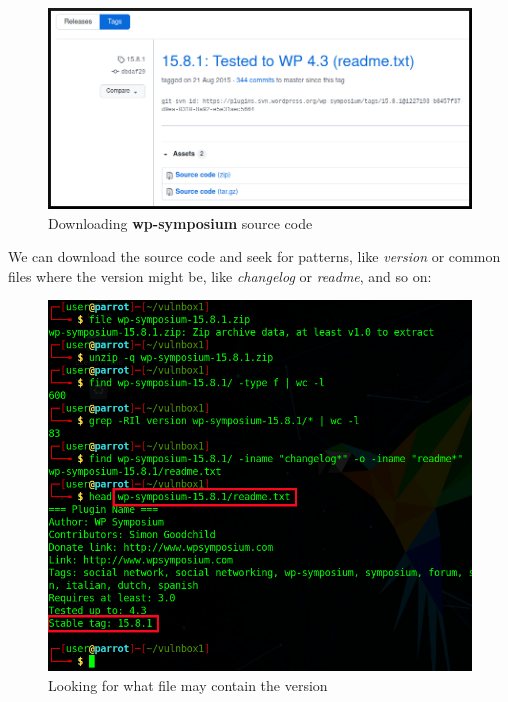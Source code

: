 \documentclass[12pt]{article}
\begin{document}
    \begin{figure}[H]\label{pic:18-github-wp-symposium}
        \centering
        \includegraphics[width=1.00\textwidth]{18-github-wp-symposium.png}
        \caption{Downloading \textbf{wp-symposium} source code}
    \end{figure}

    We can download the source code and seek for patterns, like
    \textit{version} or common files where the version might be, like
    \textit{changelog} or \textit{readme}, and so on:

    \begin{figure}[H]\label{pic:19-src-symposium}
        \centering
        \includegraphics[width=1.00\textwidth]{19-src-symposium-gimp.png}
        \caption{Looking for what file may contain the version}
    \end{figure}
\end{document}
